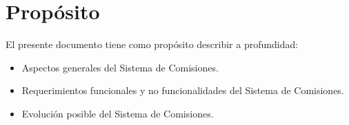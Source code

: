 \section{Propósito}

El presente documento tiene como propósito describir a profundidad:


\begin{itemize}
	\item Aspectos generales del Sistema de Comisiones.
	\item Requerimientos funcionales y no funcionalidades del Sistema de Comisiones.
	\item Evolución posible del Sistema de Comisiones.
\end{itemize}
